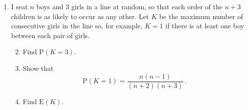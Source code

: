 \documentclass[a4, 11pt]{report}
\newlength{\qspace}
\newcounter{qnumber}
\newenvironment{question}%
 {\vspace{\qspace}
  \begin{enumerate}[\bfseries 1\quad][10]%
    \setcounter{enumi}{\value{qnumber}}%
    \item%
 }
{
  \end{enumerate}
  \filbreak
  \stepcounter{qnumber}
 }
\newenvironment{questionparts}[1][1]%
 {
  \begin{enumerate}[\bfseries (i)]%
    \setcounter{enumii}{#1}
    \addtocounter{enumii}{-1}
    \setlength{\itemsep}{5mm}
    \setlength{\parskip}{8pt}
 }
 {
  \end{enumerate}
 }
\def\E{{\mathrm E}}
\def\P{{\mathrm P}}
\begin{document}
\begin{question}
I seat $n$ boys and $3$ girls in a line    at random, so 
that each order of the $n+3$ children
is as likely to occur as any other. Let $K$ be the maximum number of 
consecutive girls in the line so, for example, $K=1$ if  
there is at least one boy between 
 each pair of girls.
\begin{questionparts}
\item Find $\P(K=3)$.
\item Show that 
\[\P(K=1)=
\frac{n(n-1)}{(n+2)(n+3)}\,.
\]
\item Find $\E(K)$.
\end{questionparts}
\end{question}
\end{document}
